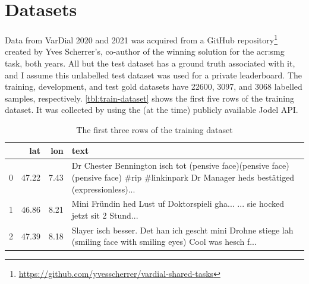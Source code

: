 \section{Datasets}
\label{sec:datasets}

Data from VarDial 2020 and 2021 was acquired from a GitHub repository\footnote{\url{https://github.com/yvesscherrer/vardial-shared-tasks}} created by Yves Scherrer's, co-author of the winning solution for the \gls{acr:smg} task, both years. All but the test dataset has a ground truth associated with it, and I assume this unlabelled test dataset was used for a private leaderboard. The training, development, and test gold datasets have 22600, 3097, and 3068 labelled samples, respectively. \autoref{tbl:train-dataset} shows the first five rows of the training dataset. It was collected by \cite[2-3]{hovyCapturingRegionalVariation2018} using the (at the time) publicly available Jodel API.

\begin{table}
    \centering
    \begin{tabular}{l|rr|p{}}
        \toprule
          & lat   & lon  & text                                                                                                                                        \\
        \midrule
        0 & 47.22 & 7.43 & Dr Chester Bennington isch tot (pensive face)(pensive face)(pensive face) \#rip \#linkinpark Dr Manager heds bestätiged (expressionless)... \\
        1 & 46.86 & 8.21 & Mini Fründin hed Lust uf Doktorspieli gha... ... sie hocked jetzt sit 2 Stund...                                                            \\
        2 & 47.39 & 8.18 & Slayer isch besser. Det han ich gescht mini Drohne stiege lah (smiling face with smiling eyes) Cool was hesch f...                          \\
        \bottomrule
    \end{tabular}
    \caption{The first three rows of the training dataset}
    \label{tbl:train-dataset}
\end{table}

